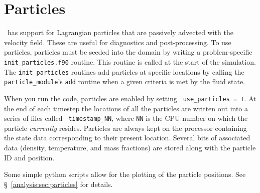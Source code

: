 \section{Particles}

\label{arch:sec:particles}

\maestro\ has support for Lagrangian particles that are passively
advected with the velocity field.  These are useful for diagnostics
and post-processing.  To use particles, particles must be seeded into
the domain by writing a problem-specific {\tt init\_particles.f90}
routine.  This routine is called at the start of the simulation.  The
{\tt init\_particles} routines add particles at specific locations by
calling the {\tt particle\_module}'s {\tt add} routine when a given
criteria is met by the fluid state.

When you run the code, particles are enabled by setting {\tt
  use\_particles = T}.  At the end of each timestep the locations of
all the particles are written out into a series of files called {\tt
  timestamp\_NN}, where {\tt NN} is the CPU number on which the
particle {\em currently} resides.  Particles are always kept on the
processor containing the state data corresponding to their present
location.  Several bits of associated data (density, temperature, and
mass fractions) are stored along with the particle ID and position.

Some simple python scripts allow for the plotting of the particle
positions.  See \S~\ref{analysis:sec:particles} for details.


